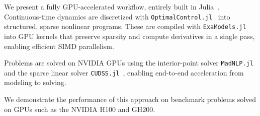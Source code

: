 \documentclass[twoside,leqno,twocolumn]{article}
\begin{document}
We present a fully GPU-accelerated workflow, entirely built in Julia~\cite{bezanson2017julia}.
Continuous-time dynamics are discretized with \texttt{OptimalControl.jl}~\cite{Caillau_OptimalControl_jl_a_Julia} into structured, sparse nonlinear programs.  
These are compiled with \texttt{ExaModels.jl}~\cite{shin2024accelerating} into GPU kernels that preserve sparsity and compute derivatives in a single pass, enabling efficient SIMD parallelism.

Problems are solved on NVIDIA GPUs using the interior-point solver \texttt{MadNLP.jl}~\cite{shin2021graph} and the sparse linear solver \texttt{CUDSS.jl}~\cite{Montoison_CUDSS_jl_Julia_interface}, enabling end-to-end acceleration from modeling to solving.

We demonstrate the performance of this approach on benchmark problems solved on GPUs such as the NVIDIA H100 and GH200.


\end{document}
